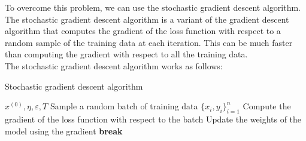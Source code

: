 To overcome this problem, we can use the stochastic gradient descent algorithm. The stochastic
gradient descent algorithm is a variant of the gradient descent algorithm that computes the
gradient of the loss function with respect to a random sample of the training data at each
iteration. This can be much faster than computing the gradient with respect to all the training
data.\\

The stochastic gradient descent algorithm works as follows:

\begin{algorithm}[H]
    \caption{Stochastic gradient descent algorithm}
    \begin{algorithmic}[1]
        \Require $x^{(0)}, \eta, \varepsilon, T$
            \State Sample a random batch of training data $\{ x_i, y_i \}_{i=1}^n$
            \State Compute the gradient of the loss function with respect to the batch
            \State Update the weights of the model using the gradient
                \State \textbf{break}
            \EndIf
        \EndFor
    \end{algorithmic}
\end{algorithm}


